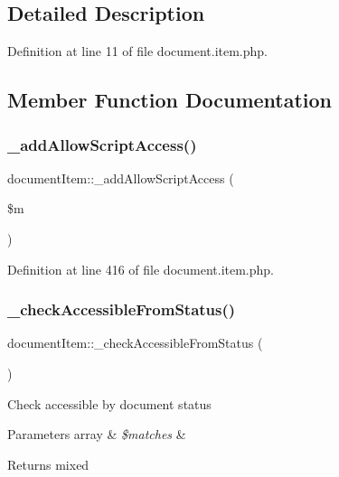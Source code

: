 \subsection{Detailed Description}


Definition at line 11 of file document.\+item.\+php.



\subsection{Member Function Documentation}
\hypertarget{classdocumentItem_a6bc6bbe65e83e9bfc03bae1fea5b75d7}{}\label{classdocumentItem_a6bc6bbe65e83e9bfc03bae1fea5b75d7} 
\subsubsection{\texorpdfstring{\+\_\+add\+Allow\+Script\+Access()}{\_addAllowScriptAccess()}}
{\footnotesize\ttfamily document\+Item\+::\+\_\+add\+Allow\+Script\+Access (\begin{DoxyParamCaption}\item[{}]{\$m }\end{DoxyParamCaption})}



Definition at line 416 of file document.\+item.\+php.

\hypertarget{classdocumentItem_a16bc4bb18f4e29b0244e647eb89e2f45}{}\label{classdocumentItem_a16bc4bb18f4e29b0244e647eb89e2f45} 
\subsubsection{\texorpdfstring{\+\_\+check\+Accessible\+From\+Status()}{\_checkAccessibleFromStatus()}}
{\footnotesize\ttfamily document\+Item\+::\+\_\+check\+Accessible\+From\+Status (\begin{DoxyParamCaption}{ }\end{DoxyParamCaption})}

Check accessible by document status 
\begin{DoxyParams}[1]{Parameters}
array & {\em \$matches} & \\
\hline
\end{DoxyParams}
\begin{DoxyReturn}{Returns}
mixed 
\end{DoxyReturn}


